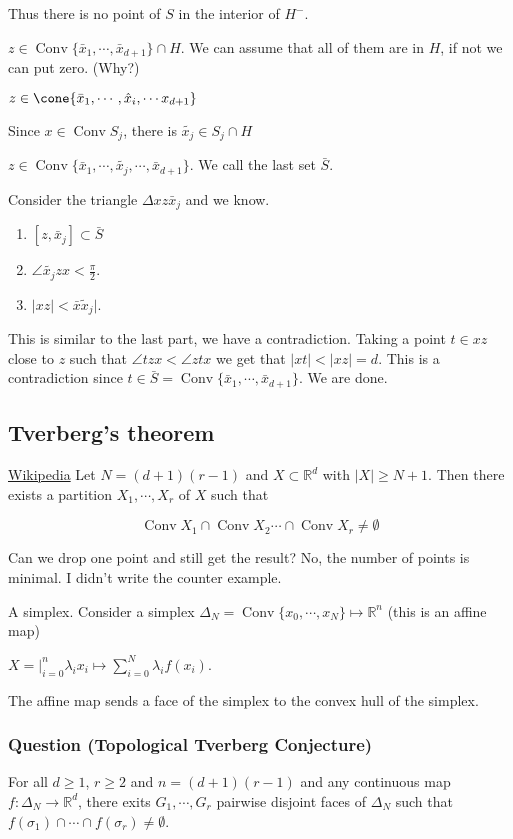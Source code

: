 \documentclass[11pt]{article}
\def\R{\mathbb{R}}
\def\conv{\operatorname{Conv}}
\begin{document}
Thus there is no point of \(S\) in the interior of \(H^{-}\).

\(z \in \conv\{\bar{x}_1, \cdots, \bar{x}_{d+1}\} \cap H\). We can assume that
all of them are in \(H\), if not we can put zero. (Why?)

\(z \in \cone\{\bar{x}_1, \cdots, \hat{x}_i, \cdots x_{d+1}\}\)

Since \(x\in \conv S_j\), there is \(\tilde{x_j} \in S_j \cap H\) 

\(z \in \conv\{\bar{x}_1, \cdots, \tilde{x_j}, \cdots, \bar{x}_{d+1}\}\). We
call the last set \(\bar{S}\).

Consider the triangle \(\Delta xz\bar{x}_j\) and we know.
\begin{enumerate}
\item \([z, \bar{x}_j] \subset \bar{S}\)
\item \(\angle \tilde{x_j}zx < \frac{\pi}{2}\).
\item \(\vert xz\vert < \bar x \tilde{x}_j\vert\).
\end{enumerate}

This is similar to the last part, we have a contradiction. Taking a point \(t
    \in xz\) close to \(z\) such that \(\angle tzx < \angle ztx\) we get that \(\vert
    xt \vert < \vert xz\vert = d\). This is a contradiction since \(t \in \bar{S}
    = \conv\{\bar{x}_1, \cdots, \bar{x}_{d+1}\}\). We are done.
\subsection{Tverberg's theorem}
\label{sec:org78b35ef}
\href{https://en.wikipedia.org/wiki/Tverberg\%27s\_theorem}{Wikipedia} Let \(N=(d+1)(r-1)\) and \(X \subset \R^d\) with \(\vert X \vert \ge
   N+1\). Then there exists a partition \(X_1, \cdots, X_r\) of \(X\) such that

$$\conv X_1 \cap \conv X_2 \cdots \cap \conv X_r \neq \emptyset$$

Can we drop one point and still get the result? No, the number of points is
minimal. I didn't write the counter example.

A simplex. Consider a simplex \(\Delta_N = \conv \{x_0, \cdots, x_N\} \mapsto
   \R^n\) (this is an affine map)

\(X = \vert_{i=0}^n \lambda_i x_i \mapsto \sum_{i=0}^N \lambda_i f(x_i)\).

The affine map sends a face of the simplex to the convex hull of the
simplex.
\subsubsection{Question (Topological Tverberg Conjecture)}
\label{sec:orgf488ac9}
For all \(d \ge 1\), \(r \ge 2\) and \(n=(d+1)(r-1)\) and any continuous map
\(f\colon \Delta_N \rightarrow \R^d\), there exits \(G_1, \cdots, G_r\) pairwise
disjoint faces of \(\Delta_N\) such that \(f(\sigma_1) \cap \cdots \cap
    f(\sigma_r) \neq \emptyset\).
\end{document}
